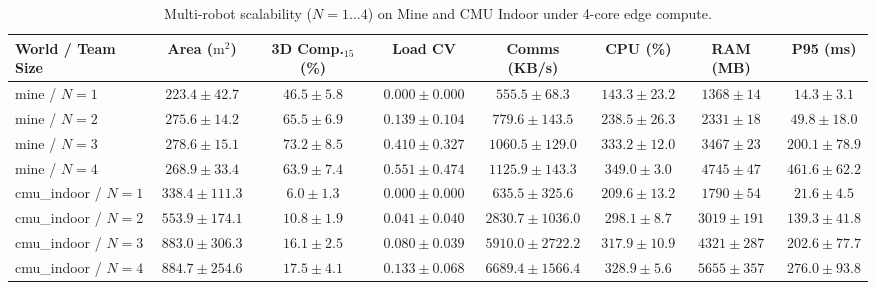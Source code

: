 \begin{table}[t]
\centering
\caption{Multi-robot scalability ($N=1\dots 4$) on Mine and CMU Indoor under 4-core edge compute.}
\label{tab:scalability}
\footnotesize
\begin{tabular}{lccccccc}
\toprule
World / Team Size & Area ($\text{m}^2$) & 3D Comp.$_{15}$ (\%) & Load CV & Comms (KB/s) & CPU (\%) & RAM (MB) & P95 (ms) \\
\midrule
mine / $N=1$ & $223.4 \pm 42.7$ & $46.5 \pm 5.8$ & $0.000 \pm 0.000$ & $555.5 \pm 68.3$ & $143.3 \pm 23.2$ & $1368 \pm 14$ & $\mathbf{14.3 \pm 3.1}$ \\
mine / $N=2$ & $275.6 \pm 14.2$ & $65.5 \pm 6.9$ & $0.139 \pm 0.104$ & $779.6 \pm 143.5$ & $238.5 \pm 26.3$ & $2331 \pm 18$ & $49.8 \pm 18.0$ \\
mine / $N=3$ & $\mathbf{278.6 \pm 15.1}$ & $\mathbf{73.2 \pm 8.5}$ & $0.410 \pm 0.327$ & $1060.5 \pm 129.0$ & $333.2 \pm 12.0$ & $3467 \pm 23$ & $200.1 \pm 78.9$ \\
mine / $N=4$ & $268.9 \pm 33.4$ & $63.9 \pm 7.4$ & $0.551 \pm 0.474$ & $1125.9 \pm 143.3$ & $349.0 \pm 3.0$ & $4745 \pm 47$ & $461.6 \pm 62.2$ \\
\midrule
cmu\_indoor / $N=1$ & $338.4 \pm 111.3$ & $6.0 \pm 1.3$ & $0.000 \pm 0.000$ & $635.5 \pm 325.6$ & $209.6 \pm 13.2$ & $1790 \pm 54$ & $\mathbf{21.6 \pm 4.5}$ \\
cmu\_indoor / $N=2$ & $553.9 \pm 174.1$ & $10.8 \pm 1.9$ & $0.041 \pm 0.040$ & $2830.7 \pm 1036.0$ & $298.1 \pm 8.7$ & $3019 \pm 191$ & $139.3 \pm 41.8$ \\
cmu\_indoor / $N=3$ & $883.0 \pm 306.3$ & $16.1 \pm 2.5$ & $0.080 \pm 0.039$ & $5910.0 \pm 2722.2$ & $317.9 \pm 10.9$ & $4321 \pm 287$ & $202.6 \pm 77.7$ \\
cmu\_indoor / $N=4$ & $\mathbf{884.7 \pm 254.6}$ & $\mathbf{17.5 \pm 4.1}$ & $0.133 \pm 0.068$ & $6689.4 \pm 1566.4$ & $328.9 \pm 5.6$ & $5655 \pm 357$ & $276.0 \pm 93.8$ \\
\bottomrule
\end{tabular}
\end{table}
